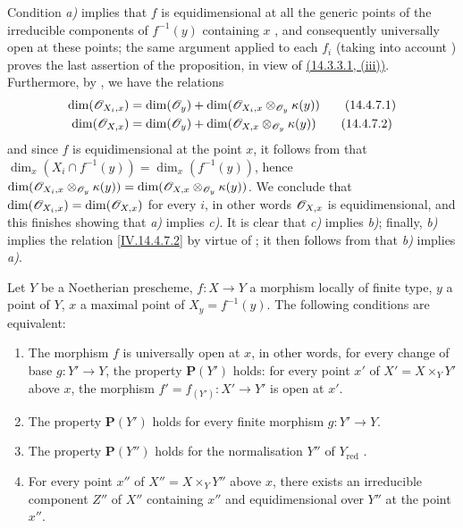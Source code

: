 Condition \emph{a)} implies that $f$ is equidimensional at all the generic points of the irreducible components of $f^{-1}(y)$ containing $x$ , and consequently  universally open at these points; the same argument applied to each $f_i$ (taking into account ) proves the last assertion of the proposition, in view of {\hyperref[IV.14.3.3.1]{(14.3.3.1, (iii))}}.
Furthermore, by , we have the relations
\begin{align}
  \dim(\mathscr{O}_{X_i,x}) &= \dim(\mathscr{O}_y) + \dim(\mathscr{O}_{X_i,x}\otimes_{\mathscr{O}_y}\kappa(y))
  \tag{14.4.7.1}\label{IV.14.4.7.1}\\
  \dim(\mathscr{O}_{X,x}) &= \dim(\mathscr{O}_y) + \dim(\mathscr{O}_{X,x}\otimes_{\mathscr{O}_y}\kappa(y))
  \tag{14.4.7.2}\label{IV.14.4.7.2}
\end{align}
and since $f$ is equidimensional at the point $x$, it follows from  that $\dim_x(X_i\cap f^{-1}(y))=\dim_x(f^{-1}(y))$, hence  $\dim(\mathscr{O}_{X_i,x}\otimes_{\mathscr{O}_y}\kappa(y))=\dim(\mathscr{O}_{X,x}\otimes_{\mathscr{O}_y}\kappa(y))$.
We conclude that $\dim(\mathscr{O}_{X_i,x})=\dim(\mathscr{O}_{X,x})$ for every $i$, in other words $\mathscr{O}_{X,x}$ is equidimensional, and this finishes showing that \emph{a)} implies \emph{c)}.
It is clear that \emph{c)} implies \emph{b)}; finally, \emph{b)} implies the relation \eqref{IV.14.4.7.2} by virtue of ; it then follows from  that \emph{b)} implies \emph{a)}.

\begin{proposition}[14.4.8]
\label{IV.14.4.8}
Let $Y$ be a Noetherian prescheme, $f:X\to Y$ a morphism locally of finite type, $y$ a point of $Y$, $x$ a maximal point of $X_y=f^{-1}(y)$.
The following conditions are equivalent:
\begin{enumerate}[label=\emph{\alph*)}]
  \item The morphism $f$ is universally open at $x$, in other words, for every change of base $g:Y'\to Y$, the property $\mathbf{P}(Y')$ holds: for every point $x'$ of $X'=X\times_Y Y'$ above $x$, the morphism $f'=f_{(Y')}:X'\to Y'$ is open at $x'$.
  \item[\emph{a$'$)}] The property $\mathbf{P}(Y')$ holds for every finite morphism $g:Y'\to Y$.
  \item[\emph{a$''$)}] The property $\mathbf{P}(Y'')$ holds for the normalisation $Y''$ of $Y_{\mathrm{red}}$ .
  \item For every point $x''$ of $X''=X\times_Y Y''$ above $x$, there exists an irreducible component $Z''$ of $X''$ containing $x''$ and equidimensional over $Y''$ at the point $x''$.
\end{enumerate}
\end{proposition}


